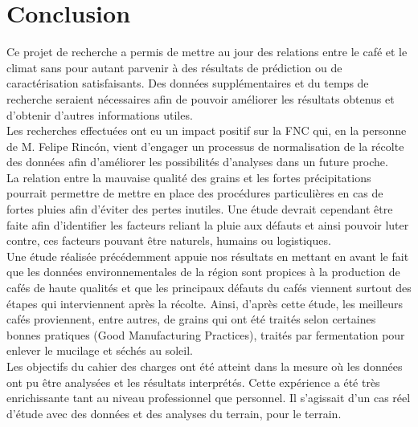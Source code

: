 

\chapter{Conclusion}




Ce projet de recherche a permis de mettre au jour des relations entre le café et le climat sans pour autant parvenir à des résultats de prédiction ou de caractérisation satisfaisants. Des données supplémentaires et du temps de recherche seraient nécessaires afin de pouvoir améliorer les résultats obtenus et d'obtenir d'autres informations utiles. \\

\noindent Les recherches effectuées ont eu un impact positif sur la FNC qui, en la personne de M. Felipe Rincón, vient d'engager un processus de normalisation de la récolte des données afin d'améliorer les possibilités d'analyses dans un future proche. \\

\noindent La relation entre la mauvaise qualité des grains et les fortes précipitations pourrait permettre de mettre en place des procédures particulières en cas de fortes pluies afin d'éviter des pertes inutiles. Une étude devrait cependant être faite afin d'identifier les facteurs reliant la pluie aux défauts et ainsi pouvoir luter contre, ces facteurs pouvant être naturels, humains ou logistiques. \\


\noindent Une étude réalisée précédemment\cite{Cenicafe} appuie nos résultats en mettant en avant le fait que les données environnementales de la région sont propices à la production de cafés de haute qualités et que les principaux défauts du cafés viennent surtout des étapes qui interviennent après la récolte. Ainsi, d'après cette étude, les meilleurs cafés proviennent, entre autres, de grains qui ont été traités selon certaines bonnes pratiques (Good Manufacturing Practices), traités par fermentation pour enlever le mucilage et séchés au soleil. \\


\noindent Les objectifs du cahier des charges ont été atteint dans la mesure où les données ont pu être analysées et les résultats interprétés. Cette expérience a été très enrichissante tant au niveau professionnel que personnel. Il s'agissait d'un cas réel d'étude avec des données et des analyses du terrain, pour le terrain. 



